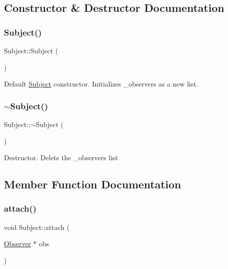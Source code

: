 \subsection{Constructor \& Destructor Documentation}
\hypertarget{class_subject_ab468044832c824c6d6c2f46272655207}{}\label{class_subject_ab468044832c824c6d6c2f46272655207} 
\subsubsection{\texorpdfstring{Subject()}{Subject()}}
{\footnotesize\ttfamily Subject\+::\+Subject (\begin{DoxyParamCaption}{ }\end{DoxyParamCaption})}

Default \hyperlink{class_subject}{Subject} constructor. Initializes \+\_\+observers as a new list. \hypertarget{class_subject_a7c4f522850f718466e5be7eb55ba1969}{}\label{class_subject_a7c4f522850f718466e5be7eb55ba1969} 
\subsubsection{\texorpdfstring{$\sim$\+Subject()}{~Subject()}}
{\footnotesize\ttfamily Subject\+::$\sim$\+Subject (\begin{DoxyParamCaption}{ }\end{DoxyParamCaption})}

Destructor. Delets the \+\_\+observers list 

\subsection{Member Function Documentation}
\hypertarget{class_subject_aec0d2f94b266d79c426b0ac454d823a5}{}\label{class_subject_aec0d2f94b266d79c426b0ac454d823a5} 
\subsubsection{\texorpdfstring{attach()}{attach()}}
{\footnotesize\ttfamily void Subject\+::attach (\begin{DoxyParamCaption}\item[{\hyperlink{class_observer}{Observer} $\ast$}]{obs }\end{DoxyParamCaption})\hspace{0.3cm}{\ttfamily [virtual]}}

